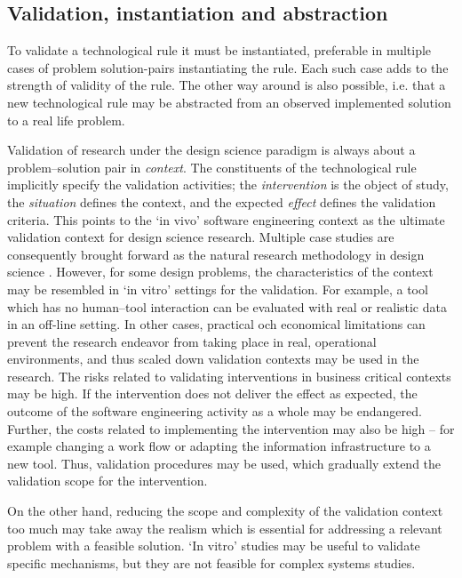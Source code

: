 \documentclass[graybox]{svmult}
\begin{document}
 

\subsection{Validation, instantiation and abstraction}

To validate a technological rule it must be instantiated, preferable in multiple cases of problem solution-pairs instantiating the rule. Each such case adds to the strength of validity of the rule. The other way around is also possible, i.e. that a new technological rule may be abstracted from an observed implemented solution to a real life problem.

Validation of research under the design science paradigm is always about a problem--solution pair in \emph{context}. The constituents of the technological rule implicitly specify the validation activities; the \emph{intervention} is the object of study, the \emph{situation} defines the context, and the expected \emph{effect} defines the validation criteria. This points to the `in vivo' software engineering context as the ultimate validation context for design science research. Multiple case studies are consequently brought forward as the natural research methodology in design science \cite{van_aken_management_2004}. However, for some design problems, the characteristics of the context may be resembled in `in vitro' settings for the validation. For example, a tool which has no human--tool interaction can be evaluated with real or realistic data in an off-line setting. In other cases, practical och economical limitations can prevent the research endeavor from taking place in real, operational environments, and thus scaled down validation contexts may be used in the research. 
The risks related to validating interventions in business critical contexts may be high. If the intervention does not deliver the effect as expected, the outcome of the software engineering activity as a whole may be endangered. Further, the costs related to implementing the intervention may also be high -- for example changing a work flow or adapting the information infrastructure to a new tool. Thus, validation procedures may be used, which gradually extend the validation scope for the intervention.

On the other hand, reducing the scope and complexity of the validation context too much may take away the realism which is essential for addressing a relevant problem with a feasible solution. `In vitro' studies may be useful to validate specific mechanisms, but they are not feasible for complex systems studies.  
\end{document}
